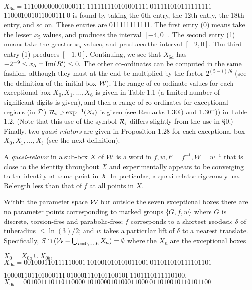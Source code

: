 \noindent 
$X_{6a} = 
111000000001000111\ 
111111110101001111\ 
011111010111111111$\hfill
{}
  \hfill $  
110001001011000111\ 0$
\vglue4pt\noindent 
is found by taking the 6th entry, the 12th entry, the 18th entry, and so on.  These entries are 011111111111.  The first entry (0) means take the
lesser $x_5$ values, and produces the interval $[-4,0].$  The second entry (1) means take the greater $x_5$ values, and produces the interval
$[-2,0].$  The third entry (1) produces $[-1,0].$  Continuing, we see that $X_{6a}^{\phantom{|}}$ has $-2^{-9} \le x_5 = {\rm Im}(R') \le 0.$  The other
co-ordinates can be computed in the same fashion, although they must at the end be multiplied by the factor $2^{(5 - i)/6}$ (see the definition of the
initial box
${\cal W}$).  The range of co-ordinate values for each  exceptional  box $X_0, X_1, \ldots, X_6$ is given in Table 1.1 (a limited number of significant
digits is given), and  then a range of co-ordinates for exceptional regions (in ${\cal P}$) 
${\cal R}_i \supset \exp^{-1}(X_i)$ is given (see Remarks 1.30i) and 1.30ii)) in Table 1.2. (Note that this use of the symbol ${\cal R}_i$ differs
slightly from the use in \S 0.)
Finally, two {\it quasi-relators} are given in Proposition 1.28 for each exceptional box $X_0, X_1, \ldots, X_6$ (see the next definition).
 

 A {\it quasi-relator} in a sub-box $X$ of ${\cal W}$ is a word in $f,w,F=f^{-1},W=w^{-1}$ that is close to the identity
throughout
$X$ and experimentally appears to be converging to the identity at some point in $X.$  In particular, a quasi-relator rigorously has Relength less than
that of $f$ at all points in $X.$
\enddemo

Within the parameter space ${\cal W}$ but outside the seven exceptional boxes there are no parameter points corresponding to 
marked groups $\{G,f,w\}$ where $G$ is 
discrete{\rm ,} torsion\/{\rm -}\/free and  parabolic\/{\rm -}\/free\/{\rm ; }
$f$ corresponds to a shortest geodesic $\delta$ of tuberadius $\le
\ln(3)/2${\rm ;} and $w$ takes a particular lift of $\delta$ to 
a nearest translate.
 Specifically{\rm ,} 
${\cal S} \cap ({\cal W} - \bigcup_{n = 0,\dots, 6} X_n)=\emptyset$ where the $X_n$ are the exceptional boxes

\vglue4pt

 \noindent $X_0 = X_{0a} \cup X_{0b},$
\noindent $X_{0a} = 
001000110111110001\ 
101001010101011001\ 
011011010111101101$\hfill 

 
 \hfill
$100001101101000111\ 
010001110101100101\ 
1101110111110100,$  
 \noindent $X_{0b} = 
001001110110110000\ 
101000010100011000\ 
011010010110101100$

